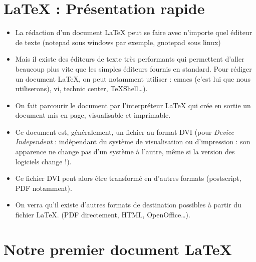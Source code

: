 \section{\LaTeX{} : Présentation rapide}
\label{slide:skel}

\begin{itemize}
\item La rédaction d'un document \LaTeX{} peut se faire avec n'importe
  quel éditeur de texte (notepad sous windows par exemple, gnotepad
  sous linux)
\item Mais il existe des éditeurs de texte très performants qui
  permettent d'aller beaucoup plus vite que les simples éditeurs
  fournis en standard. Pour rédiger un document \LaTeX, on peut
  notamment utiliser : emacs (c'est lui que nous utiliserons), vi,
  technic center, TeXShell\ldots).
\item On fait parcourir le document par l'interpréteur \LaTeX{} qui
  crée en sortie un document mis en page, visualisable et imprimable.
\item Ce document est, généralement, un fichier au format DVI (pour
  \emph{Device Independent} : indépendant du système de visualisation
  ou d'impression : son apparence ne change pas d'un système à
  l'autre, même si la version des logiciels change !).
\item Ce fichier DVI peut alors être transformé en d'autres formats
  (postscript, PDF notamment).
\item On verra qu'il existe d'autres formats de destination possibles
  à partir du fichier \LaTeX. (PDF directement, HTML,
  OpenOffice\ldots).
\end{itemize}
\vfill



\section{Notre premier document \LaTeX}

